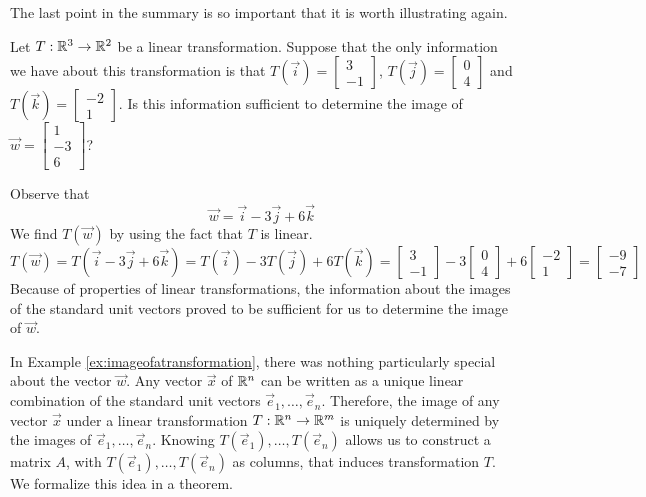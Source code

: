 \documentclass{ximera}
\begin{document}
The last point in the summary is so important that it is worth illustrating again.

\begin{example}\label{ex:imageofatransformation}  
Let $T:\mathbb{R}^3\rightarrow \mathbb{R}^2$ be a linear transformation. Suppose that the only information we have about this transformation is that $T(\vec{i})=\begin{bmatrix}3\\-1\end{bmatrix}$, $T(\vec{j})=\begin{bmatrix}0\\4\end{bmatrix}$ and $T(\vec{k})=\begin{bmatrix}-2\\1\end{bmatrix}$.  Is this information sufficient to determine the image of $\vec{w}=\begin{bmatrix}1\\-3\\6\end{bmatrix}$?

\begin{explanation}  Observe that 
$$\vec{w}=\vec{i}-3\vec{j}+6\vec{k}$$
We find $T(\vec{w})$ by using the fact that $T$ is linear.
$$T(\vec{w})=T(\vec{i}-3\vec{j}+6\vec{k})=T(\vec{i})-3T(\vec{j})+6T(\vec{k})=\begin{bmatrix}3\\-1\end{bmatrix}-3\begin{bmatrix}0\\4\end{bmatrix}+6\begin{bmatrix}-2\\1\end{bmatrix}=\begin{bmatrix}-9\\-7\end{bmatrix}$$
Because of properties of linear transformations, the information about the images of the standard unit vectors proved to be sufficient for us to determine the image of $\vec{w}$. 
\end{explanation}
\end{example}

In Example \ref{ex:imageofatransformation}, there was nothing particularly special about the vector $\vec{w}$.  Any vector $\vec{x}$ of $\mathbb{R}^n$ can be written as a unique linear combination of the standard unit vectors $\vec{e}_1,\ldots , \vec{e}_n$.  Therefore, the image of any vector $\vec{x}$ under a linear transformation $T:\mathbb{R}^n\rightarrow \mathbb{R}^m$ is uniquely determined by the images of $\vec{e}_1, \ldots , \vec{e}_n$.  Knowing $T(\vec{e}_1),\ldots , T(\vec{e}_n)$ allows us to construct a matrix $A$, with $T(\vec{e}_1),\ldots , T(\vec{e}_n)$ as columns, that induces transformation $T$.  We formalize this idea in a theorem.
\end{document}
